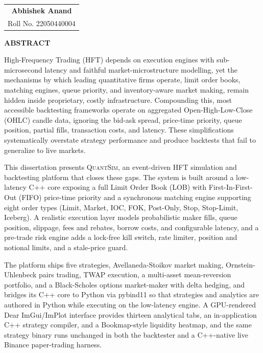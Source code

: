 \documentclass[12pt,oneside,a4paper]{report}
\newcommand{\quantsim}{\textsc{QuantSim}}
\begin{document}
\vspace{0.8in}

\begin{flushright}
\begin{tabular}{c}
\textbf{Abhishek Anand} \\
Roll No. 22050440004
\end{tabular}
\end{flushright}

\clearpage
\begin{center}
{\Large\bfseries ABSTRACT}
\end{center}
\vspace{0.2in}

High-Frequency Trading (HFT) depends on execution engines with sub-microsecond latency and faithful market-microstructure modelling, yet the mechanisms by which leading quantitative firms operate, limit order books, matching engines, queue priority, and inventory-aware market making, remain hidden inside proprietary, costly infrastructure. Compounding this, most accessible backtesting frameworks operate on aggregated Open-High-Low-Close (OHLC) candle data, ignoring the bid-ask spread, price-time priority, queue position, partial fills, transaction costs, and latency. These simplifications systematically overstate strategy performance and produce backtests that fail to generalize to live markets.

This dissertation presents \quantsim{}, an event-driven HFT simulation and backtesting platform that closes these gaps. The system is built around a low-latency C++ core exposing a full Limit Order Book (LOB) with First-In-First-Out (FIFO) price-time priority and a synchronous matching engine supporting eight order types (Limit, Market, IOC, FOK, Post-Only, Stop, Stop-Limit, Iceberg). A realistic execution layer models probabilistic maker fills, queue position, slippage, fees and rebates, borrow costs, and configurable latency, and a pre-trade risk engine adds a lock-free kill switch, rate limiter, position and notional limits, and a stale-price guard.

The platform ships five strategies, Avellaneda-Stoikov market making, Ornstein-Uhlenbeck pairs trading, TWAP execution, a multi-asset mean-reversion portfolio, and a Black-Scholes options market-maker with delta hedging, and bridges its C++ core to Python via pybind11 so that strategies and analytics are authored in Python while executing on the low-latency engine. A GPU-rendered Dear ImGui/ImPlot interface provides thirteen analytical tabs, an in-application C++ strategy compiler, and a Bookmap-style liquidity heatmap, and the same strategy binary runs unchanged in both the backtester and a C++-native live Binance paper-trading harness.
\end{document}
